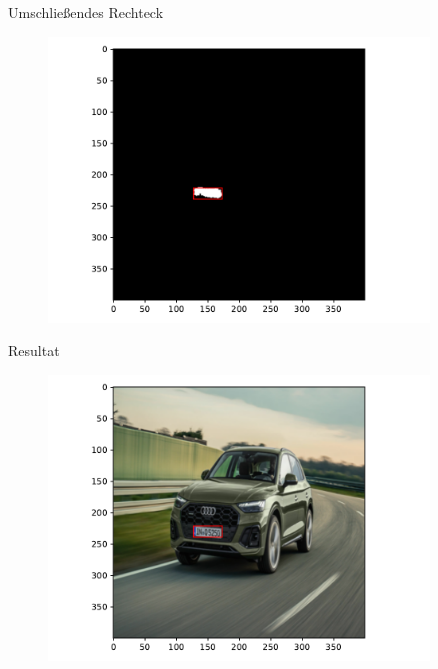 \begin{frame}{Umschlie{\ss}endes Rechteck}
    \begin{figure}
        \centering
        \includegraphics[width=0.9\textwidth]{img/model_demo_5}
    \end{figure}
\end{frame}

\begin{frame}{Resultat}
    \begin{figure}
        \centering
        \includegraphics[width=0.9\textwidth]{img/model_demo_6}
    \end{figure}
\end{frame}

